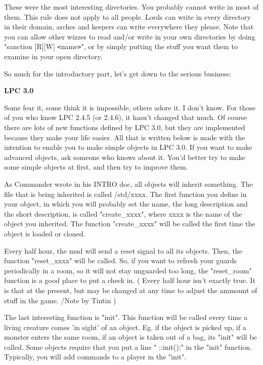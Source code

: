 These were the most interesting directories. You probably cannot write in
most of them. This rule does not apply to all people. Lords can write in
every directory in their domain, arches and keepers can write everywhere
they please. Note that you can allow other wizzes to read and/or write in
your own directories by doing "sanction [R][W] \verb+<+name\verb+>+", or by simply
putting the stuff you want them to examine in your open directory.

So much for the introductory part, let's get down to the serious business:

{\bf LPC 3.0}

Some fear it, some think it is impossible, others adore it. I don't know.
For those of you who know LPC 2.4.5 (or 2.4.6), it hasn't changed that much.
Of course there are lots of new functions defined by LPC 3.0, but they are
implemented because they make your life easier. All that is written below
is made with the intention to enable you to make simple objects in LPC 3.0.
If you want to make advanced objects, ask someone who knows about it. You'd
better try to make some simple objects at first, and then try to improve
them.

As Commander wrote in his INTRO doc, all objects will inherit something.
The file that is being inherited is called /std/xxxx. The first function
you define in your object, in which you will probably set the name, the
long description and the short description, is called "create\_xxxx", where
xxxx is the name of the object you inherited. The function "create\_xxxx"
will be called the first time the object is loaded or cloned.

Every half hour, the mud will send a reset signal to all its objects. Then,
the function "reset\_xxxx" will be called. So, if you want to refresh your
guards periodically in a room, so it will not stay unguarded too long, the
"reset\_room" function is a good place to put a check in.
( Every half hour isn't exactly true. It is that at the present, but
  may be changed at any time to adjust the ammount of stuff in the game.
  /Note by Tintin )

The last interesting function is "init". This function will be called
every time a living creature comes 'in sight' of an object. Eg. if the
object is picked up, if a monster enters the same room, if an object is
taken out of a bag, its "init" will be called. Some objects require that
you put a line "   ::init();" in the "init" function. Typically, you will
add commands to a player in the "init".

